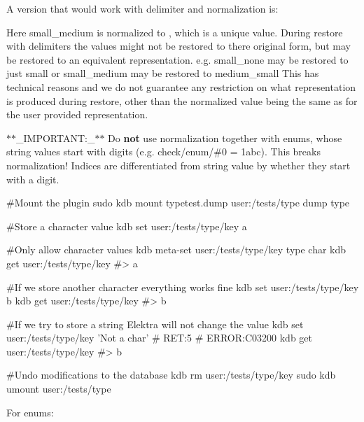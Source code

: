 A version that would work with delimiter and normalization is\+:




Here {\ttfamily small\+\_\+medium} is normalized to {}, which is a unique value. During restore with delimiters the values might not be restored to there original form, but may be restored to an equivalent representation. e.\+g. {\ttfamily small\+\_\+none} may be restored to just {\ttfamily small} or {\ttfamily small\+\_\+medium} may be restored to {\ttfamily medium\+\_\+small} This has technical reasons and we do not guarantee any restriction on what representation is produced during restore, other than the normalized value being the same as for the user provided representation.

$\ast$$\ast$\+\_\+\+I\+M\+P\+O\+R\+T\+A\+NT\+:\+\_\+$\ast$$\ast$ Do {\bfseries not} use normalization together with enums, whose string values start with digits (e.\+g. {\ttfamily check/enum/\#0 = 1abc}). This breaks normalization! Indices are differentiated from string value by whether they start with a digit.


\begin{DoxyCode}
#Mount the plugin
sudo kdb mount typetest.dump user:/tests/type dump type

#Store a character value
kdb set user:/tests/type/key a

#Only allow character values
kdb meta-set user:/tests/type/key type char
kdb get user:/tests/type/key
#> a

#If we store another character everything works fine
kdb set user:/tests/type/key b
kdb get user:/tests/type/key
#> b

#If we try to store a string Elektra will not change the value
kdb set user:/tests/type/key 'Not a char'
# RET:5
# ERROR:C03200
kdb get user:/tests/type/key
#> b

#Undo modifications to the database
kdb rm user:/tests/type/key
sudo kdb umount user:/tests/type
\end{DoxyCode}


For enums\+:




